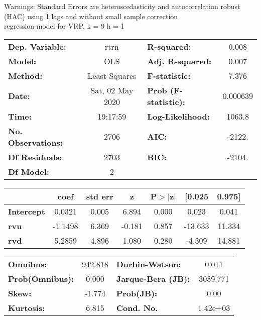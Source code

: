 Warnings: \newline
 [1] Standard Errors are heteroscedasticity and autocorrelation robust (HAC) using 1 lags and without small sample correction\\ 

regression model for VRP, k = 9 h = 1\begin{center}
\begin{tabular}{lclc}
\toprule
\textbf{Dep. Variable:}    &       rtrn       & \textbf{  R-squared:         } &     0.008   \\
\textbf{Model:}            &       OLS        & \textbf{  Adj. R-squared:    } &     0.007   \\
\textbf{Method:}           &  Least Squares   & \textbf{  F-statistic:       } &     7.376   \\
\textbf{Date:}             & Sat, 02 May 2020 & \textbf{  Prob (F-statistic):} &  0.000639   \\
\textbf{Time:}             &     19:17:59     & \textbf{  Log-Likelihood:    } &    1063.8   \\
\textbf{No. Observations:} &        2706      & \textbf{  AIC:               } &    -2122.   \\
\textbf{Df Residuals:}     &        2703      & \textbf{  BIC:               } &    -2104.   \\
\textbf{Df Model:}         &           2      & \textbf{                     } &             \\
\bottomrule
\end{tabular}
\begin{tabular}{lcccccc}
                   & \textbf{coef} & \textbf{std err} & \textbf{z} & \textbf{P$> |$z$|$} & \textbf{[0.025} & \textbf{0.975]}  \\
\midrule
\textbf{Intercept} &       0.0321  &        0.005     &     6.894  &         0.000        &        0.023    &        0.041     \\
\textbf{rvu}       &      -1.1498  &        6.369     &    -0.181  &         0.857        &      -13.633    &       11.334     \\
\textbf{rvd}       &       5.2859  &        4.896     &     1.080  &         0.280        &       -4.309    &       14.881     \\
\bottomrule
\end{tabular}
\begin{tabular}{lclc}
\textbf{Omnibus:}       & 942.818 & \textbf{  Durbin-Watson:     } &    0.011  \\
\textbf{Prob(Omnibus):} &   0.000 & \textbf{  Jarque-Bera (JB):  } & 3059.771  \\
\textbf{Skew:}          &  -1.774 & \textbf{  Prob(JB):          } &     0.00  \\
\textbf{Kurtosis:}      &   6.815 & \textbf{  Cond. No.          } & 1.42e+03  \\
\bottomrule
\end{tabular}
\end{center}

